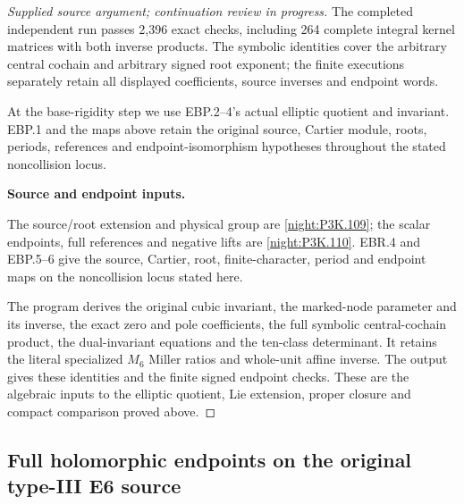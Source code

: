 \begin{proof}[Supplied source argument; continuation review in progress]
The completed independent run passes 2,396 exact checks, including 264
complete integral kernel matrices with both inverse products. The
symbolic identities cover the arbitrary central cochain and arbitrary
signed root exponent; the finite executions separately retain all
displayed coefficients, source inverses and endpoint words.

At the base-rigidity step we use EBP.2--4's actual elliptic quotient
and invariant. EBP.1 and the maps above retain the original source,
Cartier module, roots, periods, references and endpoint-isomorphism
hypotheses throughout the stated noncollision locus.




\par\medskip\noindent\textbf{Source and endpoint inputs.}\par
The source/root extension and physical group are
\cref{night:P3K.109}; the scalar endpoints, full references and negative
lifts are \cref{night:P3K.110}. EBR.4 and EBP.5--6 give the source,
Cartier, root, finite-character, period and endpoint maps on the
noncollision locus stated here.

The program  derives the original cubic invariant,
the marked-node parameter and its inverse, the exact zero and pole
coefficients, the full symbolic central-cochain product, the dual-invariant
equations and the ten-class determinant. It retains the literal specialized
$M_6$ Miller ratios and whole-unit affine inverse. The output
 gives these identities and the finite signed
endpoint checks. These are the algebraic inputs to the elliptic quotient,
Lie extension, proper closure and compact comparison proved above.



\end{proof}


\subsection{Full holomorphic endpoints on the original type-III E6 source}
